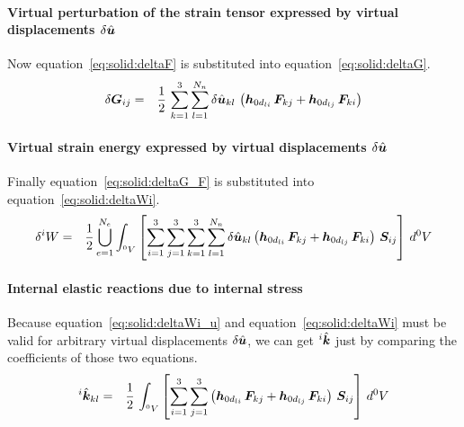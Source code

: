 \paragraph{Virtual perturbation of the strain tensor expressed by virtual displacements $\delta{\hat{\bm{u}}}$}
Now equation~\ref{eq:solid:deltaF} is substituted into equation~\ref{eq:solid:deltaG}.
\begin{eqnarray}
\delta \bm{G}_{ij} & = & \frac{1}{2} \, \sum_{k=1}^3 \sum_{l=1}^{N_n} \delta \hat{\bm{u}}_{kl} \, \left( \bm{h}_{0d_{li}} \, \bm{F}_{kj} + \bm{h}_{0d_{lj}} \, \bm{F}_{ki} \right) \label{eq:solid:deltaG_F}
\end{eqnarray}

\paragraph{Virtual strain energy expressed by virtual displacements $\delta{\hat{\bm{u}}}$}
Finally equation~\ref{eq:solid:deltaG_F} is substituted into equation~\ref{eq:solid:deltaWi}.
\begin{eqnarray}
\delta ^iW & = & \frac{1}{2} \bigcup_{e=1}^{N_e} \int_{^0V} \left[ \sum_{i=1}^3 \sum_{j=1}^3 \sum_{k=1}^3 \sum_{l=1}^{N_n} \delta \hat{\bm{u}}_{kl}\left(\bm{h}_{0d_{li}} \, \bm{F}_{kj} + \bm{h}_{0d_{lj}} \, \bm{F}_{ki}\right) \, \bm{S}_{ij} \right] \, d^0V \label{eq:solid:deltaWi_u}
\end{eqnarray}

\paragraph{Internal elastic reactions due to internal stress}
Because equation~\ref{eq:solid:deltaWi_u} and equation~\ref{eq:solid:deltaWi} must be valid for arbitrary virtual displacements $\delta\hat{\bm{u}}$, we can get $^i\hat{\bm{k}}$ just by comparing the coefficients of those two equations.
\begin{eqnarray}
^i\hat{\bm{k}}_{kl} & = & \frac{1}{2} \, \int_{^0V} \left[ \sum_{i=1}^3 \sum_{j=1}^3 \left(\bm{h}_{0d_{li}} \, \bm{F}_{kj} + \bm{h}_{0d_{lj}} \, \bm{F}_{ki}\right) \, \bm{S}_{ij} \right] \, d^0V \label{eq:solid:ki}
\end{eqnarray}

